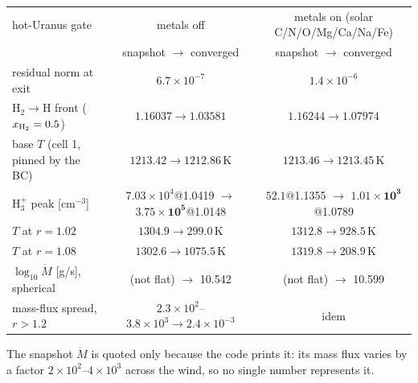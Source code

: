 \documentclass[english,a4paper]{my_memo}
\newcommand{\Mdot}{\dot{M}}
\begin{document}
\begin{center}\small
\begin{tabular}{@{}lcc@{}}
\toprule
hot-Uranus gate & metals off & metals on (solar C/N/O/Mg/Ca/Na/Fe) \\
 & snapshot $\to$ converged & snapshot $\to$ converged \\
\midrule
residual norm at exit & $6.7\times10^{-7}$ & $1.4\times10^{-6}$ \\
H$_2\to$H front ($x_{\rm H_2}=0.5$) & $1.16037\to\mathbf{1.03581}$ & $1.16244\to\mathbf{1.07974}$ \\
base $T$ (cell 1, pinned by the BC) & $1213.42\to1212.86$\,K & $1213.46\to1213.45$\,K \\
H$_3^+$ peak [cm$^{-3}$] & $7.03\!\times\!10^{4}$@1.0419 $\to$ $\mathbf{3.75\!\times\!10^{5}}$@1.0148 & $52.1$@1.1355 $\to$ $\mathbf{1.01\!\times\!10^{3}}$@1.0789 \\
$T$ at $r=1.02$ & $1304.9\to\mathbf{299.0}$\,K & $1312.8\to\mathbf{928.5}$\,K \\
$T$ at $r=1.08$ & $1302.6\to1075.5$\,K & $1319.8\to\mathbf{208.9}$\,K \\
$\log_{10}\Mdot$ [g/s], spherical & (not flat) $\to$ 10.542 & (not flat) $\to$ 10.599 \\
mass-flux spread, $r>1.2$ & $2.3\!\times\!10^{2}$--$3.8\!\times\!10^{3}\to2.4\times10^{-3}$ & idem \\
\bottomrule
\end{tabular}
\end{center}

\noindent The snapshot $\Mdot$ is quoted only because the code prints it: its mass
flux varies by a factor $2\times10^{2}$--$4\times10^{3}$ across the wind, so no
single number represents it.
\end{document}
